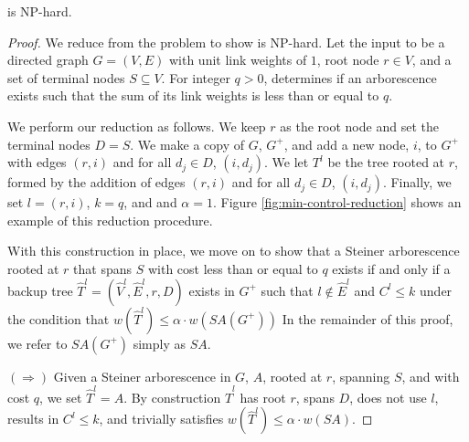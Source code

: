 \begin{theorem}
\label{thm:mco-npc}
\mco is NP-hard.
\end{theorem}
\begin{proof}
We reduce from the \arbor problem to show \mco is NP-hard.  Let the input to \arbor be a directed graph $G=(V,E)$ with unit link weights of $1$, root node $r \in V$, and
a set of terminal nodes $S \subseteq V$. For integer $q>0$, \arbor determines if an arborescence exists such that the sum of its link weights is less than or equal to $q$.

We perform our reduction as follows. %
We keep $r$ as the root node and set the terminal nodes $D = S$. We make a copy of $G$, $G^+$, and add a new node, $i$, to $G^+$ with edges $(r,i)$ and 
for all $d_j \in D$, $(i,d_j)$.  We let $T^l$ be the tree rooted at $r$, formed by the addition of edges $(r,i)$ and for all $d_j \in D$, $(i,d_j)$. Finally, we set $l = (r,i)$, $k=q$, and
and $\alpha = 1$. Figure \ref{fig:min-control-reduction} shows an example of this reduction procedure.

With this construction in place, we move on to show that a Steiner arborescence rooted at $r$ that spans $S$ with cost less than or equal to $q$ exists if and only if a
backup tree $\hat{T}^l=(\hat{V}^l,\hat{E}^l,r,D)$ exists in $G^+$ such that $l \notin \hat{E}^l$ and $C^l \leq k$ under the condition that $w(\hat{T}^l) \leq \alpha \cdot w(SA(G^+))$
In the remainder of this proof, we refer to $SA(G^+)$ simply as $SA$.

$(\Rightarrow)$  Given a Steiner arborescence in $G$, $A$, rooted at $r$, spanning $S$, and with cost $q$, we set $\hat{T}^l = A$. By construction $\hat{T}^l$ has root $r$, 
spans $D$, does not use $l$, results in $C^l \leq k$, and trivially satisfies $w(\hat{T}^l) \leq \alpha \cdot w(SA)$.



\end{proof}
